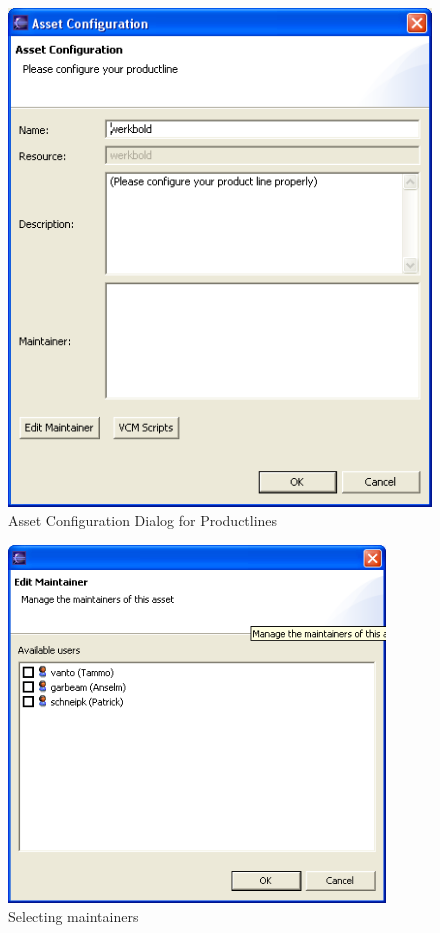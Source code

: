\begin{figure}[h!]
\begin{center}
\includegraphics[width=12cm]{configpl.png}
   \caption{Asset Configuration Dialog for Productlines}
\label{configpl}
\end{center}
\end{figure}\par

\begin{figure}[h!]
\begin{center}
\includegraphics[width=10cm]{maintainer.png}
   \caption{Selecting maintainers}
\label{maintainer}
\end{center}
\end{figure}\par


